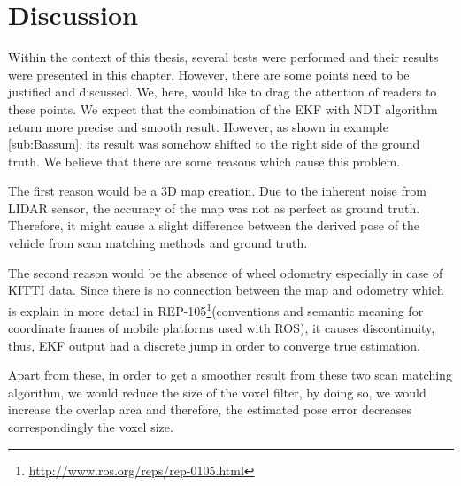 \section{Discussion}
Within the context of this thesis, several tests were performed and their results were presented in this chapter. However, there are some points need to be justified and discussed. We, here, would like to drag the attention of readers to these points. We expect that the combination of the EKF with NDT algorithm return more precise and smooth result. However, as shown in example \ref{sub:Bassum}, its result was somehow shifted to the right side of the ground truth. We believe that there are some reasons which cause this problem.  
\par The first reason would be a 3D map creation. Due to the inherent noise from LIDAR sensor, the accuracy of the map was not as perfect as ground truth. Therefore, it might cause a slight difference between the derived pose of the vehicle from scan matching methods and ground truth.
\par The second reason would be the absence of wheel odometry especially in case of KITTI data. Since there is no connection between the map and odometry which is explain in more detail in  REP-105\footnote{\url{http://www.ros.org/reps/rep-0105.html}}(conventions and semantic meaning for coordinate frames of mobile platforms used with ROS), it causes discontinuity, thus, EKF output had a discrete jump in order to converge true estimation.
\par Apart from these, in order to get a smoother result from these two scan matching algorithm, we would reduce the size of the voxel filter, by doing so, we would increase the overlap area and therefore, the estimated pose error decreases correspondingly the voxel size.

